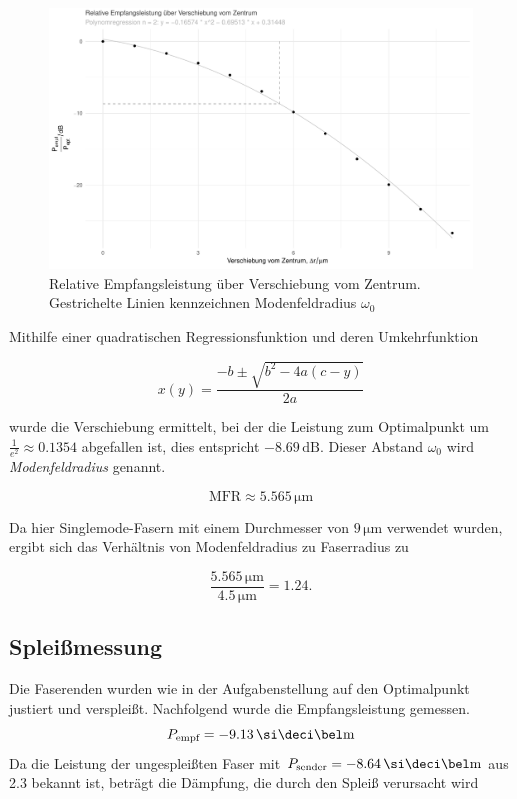 \begin{figure}
\centering
\includegraphics[width=\textwidth]{graphics/leistungsprofil/leistungsprofil.pdf}
\caption{Relative Empfangsleistung über Verschiebung vom Zentrum. Gestrichelte Linien kennzeichnen Modenfeldradius $\omega_{0}$}
\end{figure}

Mithilfe einer quadratischen Regressionsfunktion und deren Umkehrfunktion

\[x(y) = \frac{-b \pm \sqrt{b^{2} - 4a(c-y)}}{2a}\]

wurde die Verschiebung  ermittelt, bei der die Leistung zum Optimalpunkt um $\frac{1}{e^{2}} \approx 0.1354$ abgefallen ist, dies entspricht $-8.69 \, \si{\deci\bel}$. Dieser Abstand $\omega_{0}$ wird \emph{Modenfeldradius} genannt.

\[\text{MFR} \approx 5.565 \, \si{\micro\meter} \]

Da hier Singlemode-Fasern mit einem Durchmesser von $9 \, \si{\micro\meter}$ verwendet wurden, ergibt sich das Verhältnis von Modenfeldradius zu Faserradius zu

\[\frac{5.565 \, \si{\micro\meter}}{4.5 \, \si{\micro\meter}} = 1.24.\]


\subsection{Spleißmessung}
Die Faserenden wurden wie in der Aufgabenstellung auf den Optimalpunkt justiert und verspleißt. Nachfolgend wurde die Empfangsleistung gemessen.
\[P_{\text{empf}} = -9.13 \, \dBm\]
Da die Leistung der ungespleißten Faser mit $P_{\text{sender}} = -8.64 \, \dBm$ aus 2.3 bekannt ist, beträgt die Dämpfung, die durch den Spleiß verursacht wird


